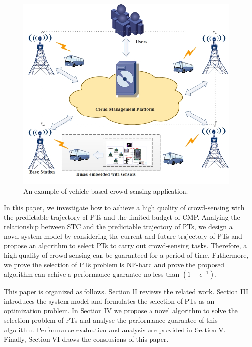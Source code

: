 \documentclass[journal]{IEEEtran}
\begin{document}
\begin{figure}[t]
	\centering
	\includegraphics[width=1.0\linewidth]{Figure1.png}
	\caption[Fig.1]{An example of vehicle-based crowd sensing application.}
	\label{Figure1}
\end{figure}

In this paper, we investigate how to achieve a high quality of crowd-sensing with the predictable trajectory of PTs and the limited budget of CMP. Analying the relationship between STC and the predictable trajectory of PTs, we design a novel system model by considering the current and future trajectory of PTs and propose an algorithm to select PTs to carry out crowd-sensing tasks. Therefore, a high quality of crowd-sensing can be guaranteed for a period of time. Futhermore, we prove the selection of PTs problem is NP-hard and prove the proposed algorithm can achive a performance guarantee  no less than $\left ( 1-e^{-1} \right )$.

This paper is organized as follows. Section II reviews the related work. Section III introduces the system model and formulates the selection of PTs as an optimization problem. In Section IV we propose a novel algorithm to solve the selection problem of PTs and analyse the performance guarantee of this algorithm. Performance evaluation and analysis are provided in Section V. Finally, Section VI draws the conslusions of this paper.
\end{document}
